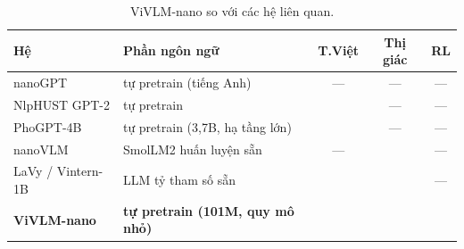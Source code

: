 \begin{table}[H]
	\centering
	\caption{ViVLM-nano so với các hệ liên quan.}
	\label{tab:related}
	\small
	\begin{tabularx}{\textwidth}{lXccc}
		\hline
		\textbf{Hệ} & \textbf{Phần ngôn ngữ} & \textbf{T.Việt} & \textbf{Thị giác} & \textbf{RL} \\
		\hline
		nanoGPT & tự pretrain (tiếng Anh) & --- & --- & --- \\
		NlpHUST GPT-2 & tự pretrain & \checkmark & --- & --- \\
		PhoGPT-4B & tự pretrain (3,7B, hạ tầng lớn) & \checkmark & --- & --- \\
		nanoVLM & SmolLM2 huấn luyện sẵn & --- & \checkmark & --- \\
		LaVy / Vintern-1B & LLM tỷ tham số sẵn & \checkmark & \checkmark & --- \\
		\textbf{ViVLM-nano} & \textbf{tự pretrain (101M, quy mô nhỏ)} & \checkmark & \checkmark & \checkmark \\
		\hline
	\end{tabularx}
\end{table}
